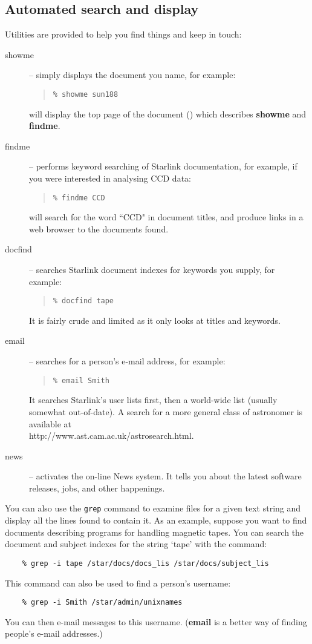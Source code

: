 \subsection{Automated search and display}

Utilities are provided to help you find things and keep in touch:

\begin{description}
\item [showme] -- simply displays the document you name, for example:
 \begin{quote}
 {\tt \% showme sun188}
 \end{quote}
 will display the top page of the document
 ()
 which describes {\bf showme} and {\bf findme}.
\item [findme] -- performs keyword searching of Starlink documentation,
 for example, if you were interested in analysing CCD data:
 \begin{quote}
 {\tt \% findme CCD}
 \end{quote}
 will search for the word ``CCD" in document titles, and produce links in a
 web browser to the documents found.
\item [docfind] -- searches Starlink document indexes for keywords you supply,
 for example:
 \begin{quote}
 {\tt \% docfind tape}
 \end{quote}
 It is fairly crude and limited as it only looks at titles and keywords.
\item [email] -- searches for a person's e-mail address, for example:
 \begin{quote}
 {\tt \% email Smith}
 \end{quote}
 It searches Starlink's user lists first, then a world-wide list (usually
 somewhat out-of-date).
 A search for a more general class of astronomer is available at\\
 {http://www.ast.cam.ac.uk/astrosearch.html}.
\item [news] -- activates the on-line News system.
 It tells you about the latest software releases, jobs, and other happenings.
\end{description}

You can also use the {\tt grep} command to examine files for a given text
string and display all the lines found to contain it.
As an example, suppose you want to find documents describing programs for
handling magnetic tapes.
You can search the document and subject indexes for the string `tape' with the
command:
{\small
\begin{verbatim}
    % grep -i tape /star/docs/docs_lis /star/docs/subject_lis
\end{verbatim}
}
This command can also be used to find a person's username:
{\small
\begin{verbatim}
    % grep -i Smith /star/admin/unixnames
\end{verbatim}
}
You can then e-mail messages to this username.
({\bf email} is a better way of finding people's e-mail addresses.)

